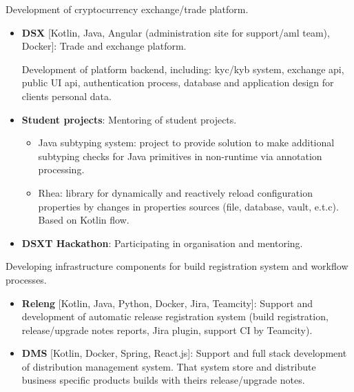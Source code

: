 \documentclass{cv}
\begin{document}
\begin{cvblock}{%
		}

	Development of cryptocurrency exchange/trade platform.

	\begin{itemize}
		\item \textbf{DSX} [Kotlin, Java, Angular (administration site for support/aml team), Docker]: Trade and exchange platform.

		      Development of platform backend, including:
		      kyc/kyb system, exchange api, public UI api, authentication process,
		      database and application design for clients personal data.
		\item \textbf{Student projects}: Mentoring of student projects.
		      \begin{itemize}
			      \item Java subtyping system: project to provide solution to make additional
			            subtyping checks for Java primitives in non-runtime via annotation processing.
			      \item Rhea: library for dynamically and reactively reload configuration properties
			            by changes in properties sources (file, database, vault, e.t.c). Based on
			            Kotlin flow.
		      \end{itemize}
		\item \textbf{DSXT Hackathon}: Participating in organisation and mentoring.
	\end{itemize}
\end{cvblock}

\begin{cvblock}{%
		}

	Developing infrastructure components for build registration
	system and workflow processes.

	\begin{itemize}
		\item \textbf{Releng} [Kotlin, Java, Python, Docker, Jira, Teamcity]: Support and development of automatic release registration system
		      (build registration, release/upgrade notes reports, Jira plugin,
		      support CI by Teamcity).
		\item \textbf{DMS} [Kotlin, Docker, Spring, React.js]: Support and full stack development of distribution management system. That system store and distribute
		      business specific products builds with theirs release/upgrade notes.
	\end{itemize}
\end{cvblock}
\end{document}
